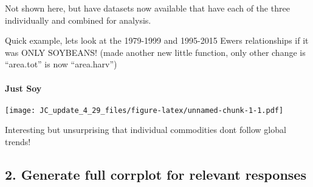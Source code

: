 \documentclass[
]{article}
\newenvironment{Shaded}{\begin{snugshade}}{\end{snugshade}}
\newcommand{\DataTypeTok}[1]{\textcolor[rgb]{0.13,0.29,0.53}{#1}}
\newcommand{\DecValTok}[1]{\textcolor[rgb]{0.00,0.00,0.81}{#1}}
\newcommand{\KeywordTok}[1]{\textcolor[rgb]{0.13,0.29,0.53}{\textbf{#1}}}
\newcommand{\NormalTok}[1]{#1}
\newcommand{\OperatorTok}[1]{\textcolor[rgb]{0.81,0.36,0.00}{\textbf{#1}}}
\newcommand{\StringTok}[1]{\textcolor[rgb]{0.31,0.60,0.02}{#1}}
\begin{document}
Not shown here, but have datasets now available that have each of the
three individually and combined for analysis.

Quick example, lets look at the 1979-1999 and 1995-2015 Ewers
relationships if it was ONLY SOYBEANS! (made another new little
function, only other change is ``area.tot'' is now ``area.harv'')

\hypertarget{just-soy}{%
\paragraph{Just Soy}\label{just-soy}}

\begin{Shaded}
\end{Shaded}

\texttt{[image: JC\_update\_4\_29\_files/figure-latex/unnamed-chunk-1-1.pdf]}

Interesting but unsurprising that individual commodities dont follow
global trends!

\hypertarget{generate-full-corrplot-for-relevant-responses}{%
\subsection{2. Generate full corrplot for relevant
responses}\label{generate-full-corrplot-for-relevant-responses}}
\end{document}
